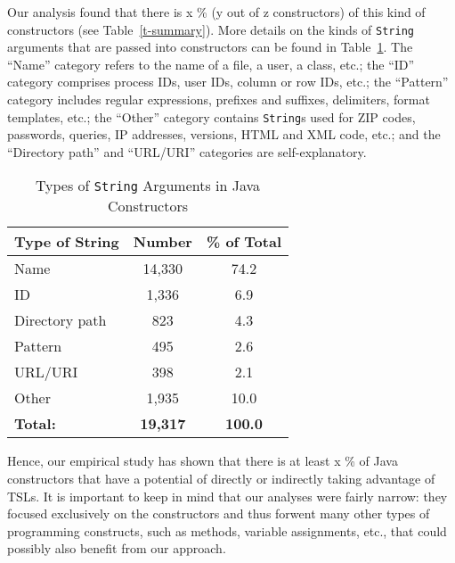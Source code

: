 Our analysis found that there is x \% (y out of z constructors) of this kind of constructors (see Table~\ref{t-summary}). More details on the kinds of \lstinline{String} arguments that are passed into constructors can be found in Table~\ref{t-strs-in-constrs}. The ``Name'' category refers to the name of a file, a user, a class, etc.; the ``ID'' category comprises process IDs, user IDs, column or row IDs, etc.; the ``Pattern'' category includes regular expressions, prefixes and suffixes, delimiters, format templates, etc.; the ``Other'' category contains \lstinline{String}s used for ZIP codes, passwords, queries, IP addresses, versions, HTML and XML code, etc.; and the ``Directory path'' and ``URL/URI'' categories are self-explanatory.

\begin{table}
   \centering
    \begin{tabular}{l | c | c}
    \bf Type of String & \bf Number & \bf \% of Total \\ \hline
    Name & 14,330 & 74.2 \\
    ID	& 1,336 & 6.9 \\
    Directory path& 823 & 4.3 \\
    Pattern & 495 & 2.6 \\
    URL/URI & 398 & 2.1 \\
    Other & 1,935 & 10.0 \\ \hline
    \bf Total: & \bf 19,317 & \bf 100.0
    \end{tabular}
    \vspace{0.15in}
    \caption{Types of \lstinline{String} Arguments in Java Constructors}
    \label{t-strs-in-constrs}
\end{table}

Hence, our empirical study has shown that there is at least x \% of Java constructors that have a potential of directly or indirectly taking advantage of TSLs. It is important to keep in mind that our analyses were fairly narrow: they focused exclusively on the constructors and thus forwent many other types of programming constructs, such as methods, variable assignments, etc., that could possibly also benefit from our approach.


